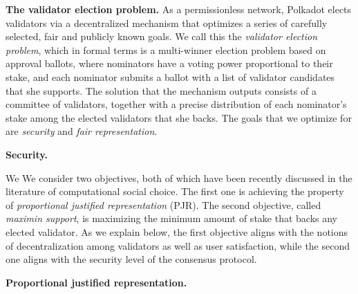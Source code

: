 \textbf{The validator election problem.} As a permissionless network, Polkadot elects validators via a decentralized mechanism that optimizes a series of carefully selected, fair and publicly known goals. We call this the \emph{validator election problem}, which in formal terms is a multi-winner election problem based on approval ballots, where nominators have a voting power proportional to their stake, and each nominator submits a ballot with a list of validator candidates that she supports. The solution that the mechanism outputs consists of a committee of \nval validators, together with a precise distribution of each nominator's stake among the elected validators that she backs. The goals that we optimize for are \emph{security} and \emph{fair representation}.

\textbf{Security.} 

We
We consider two objectives, both of which have been recently discussed in the literature of computational social choice. The first one is achieving the property of \emph{proportional justified representation} (PJR). The second objective, called \emph{maximin support}, is maximizing the minimum amount of stake that backs any elected validator. As we explain below, the first objective aligns with the notions of decentralization among validators as well as user satisfaction, while the second one aligns with the security level of the consensus protocol. 

\textbf{Proportional justified representation.}

